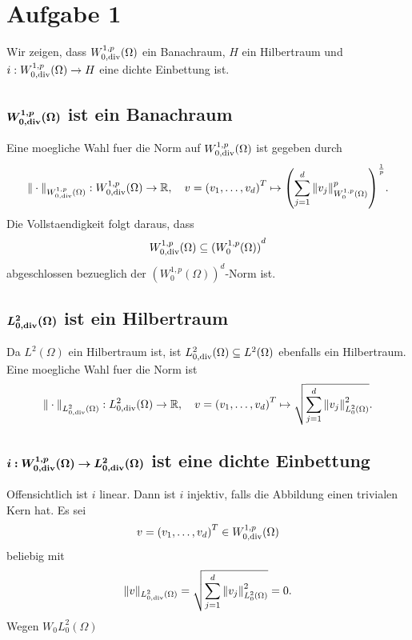 \documentclass{article}
\begin{document}
\section*{Aufgabe 1}

Wir zeigen, dass $W_{0, \operatorname{div}}^{1,p}(\Omega)$ ein Banachraum, $H$ ein Hilbertraum und $i:W_{0, \operatorname{div}}^{1,p}(\Omega) \rightarrow H$ eine dichte Einbettung ist.

\subsection*{$\bm{W_{0, \operatorname{div}}^{1,p}(\Omega)}$ ist ein Banachraum}

Eine moegliche Wahl fuer die Norm auf $W_{0, \operatorname{div}}^{1,p}(\Omega)$ ist gegeben durch
\begin{equation*}
  {\Vert \cdot \Vert}_{W_{0, \operatorname{div}}^{1,p}(\Omega)} : W_{0, \operatorname{div}}^{1,p}(\Omega) \rightarrow \mathbb{R}, \quad
  v = {(v_1, \dots, v_d)}^T \mapsto {\left( \sum_{j = 1}^{d} {\Vert v_j \Vert}_{W_0^{1,p}(\Omega)}^p \right)}^{\frac{1}{p}}.
\end{equation*}
Die Vollstaendigkeit folgt daraus, dass 
\begin{equation*}
  W_{0, \operatorname{div}}^{1,p}(\Omega) \subseteq {(W_0^{1,p}(\Omega))}^d
\end{equation*}
abgeschlossen bezueglich der ${(W_0^{1,p}(\Omega))}^d$-Norm ist.

\subsection*{$\bm{L_{0, \operatorname{div}}^2(\Omega)}$ ist ein Hilbertraum}

Da $L^2(\Omega)$ ein Hilbertraum ist, ist $L_{0, \operatorname{div}}^2(\Omega) \subseteq L^2(\Omega)$ ebenfalls ein Hilbertraum. Eine moegliche Wahl fuer die Norm ist
\begin{equation*}
  {\Vert \cdot \Vert}_{L_{0, \operatorname{div}}^2(\Omega)} : L_{0, \operatorname{div}}^2(\Omega) \rightarrow \mathbb{R}, \quad
  v = {(v_1, \dots, v_d)}^T \mapsto \sqrt{\sum_{j = 1}^{d} {\Vert v_j \Vert}_{L_0^2(\Omega)}^2}.
\end{equation*}

\subsection*{$\bm{i: W_{0, \operatorname{div}}^{1,p}(\Omega) \rightarrow L_{0, \operatorname{div}}^2(\Omega)}$ ist eine dichte Einbettung}

Offensichtlich ist $i$ linear. Dann ist $i$ injektiv, falls die Abbildung einen trivialen Kern hat. Es sei
\begin{equation*}
  v = {(v_1, \dots, v_d)}^T \in W_{0, \operatorname{div}}^{1,p}(\Omega)
\end{equation*}
beliebig mit
\begin{equation*}
  \Vert v \Vert_{L_{0, \operatorname{div}}^2(\Omega)}
  = \sqrt{\sum_{j = 1}^{d} {\Vert v_j \Vert}_{L_0^2(\Omega)}^2}
  = 0.
\end{equation*}
Wegen $W_0^{}L_0^2(\Omega)$
\end{document}
